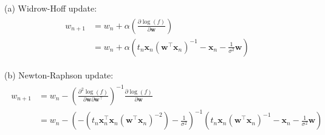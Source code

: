 \documentclass[10pt]{article}
\begin{document}
\begin{itemize}
(a)  Widrow-Hoff update:
\begin{eqnarray*}
\begin{aligned}
w_{n+1} &= w_n + \alpha \left(\frac{\partial \log(f)}{\partial \mathbf{w}}\right)
\\
&= w_n + \alpha \left(
t_n \mathbf{x}_n (\mathbf{w}^\top \mathbf{x}_n)^{-1} 
- \mathbf{x}_n - \frac{1}{\sigma^2}\mathbf{w}
\right)
\end{aligned}
\end{eqnarray*}

(b)  Newton-Raphson update:
\begin{eqnarray*}
\begin{aligned}
w_{n+1} &= w_n - 
\left(
\frac{\partial^2 \log(f)}{\partial \mathbf{w} \partial \mathbf{w}^\top }
\right)^{-1}
\frac{\partial \log(f)}{\partial \mathbf{w}}
\\
&= w_n - 
\left(
-( t_n \mathbf{x}_n^\top \mathbf{x}_n ( \mathbf{w}^\top \mathbf{x}_n)^{-2}) - \frac{1}{\sigma^2}
\right)^{-1}
\left(
t_n \mathbf{x}_n (\mathbf{w}^\top \mathbf{x}_n)^{-1} - \mathbf{x}_n - \frac{1}{\sigma^2}\mathbf{w}
\right)
\end{aligned}
\end{eqnarray*}

\end{itemize}
\end{document}
